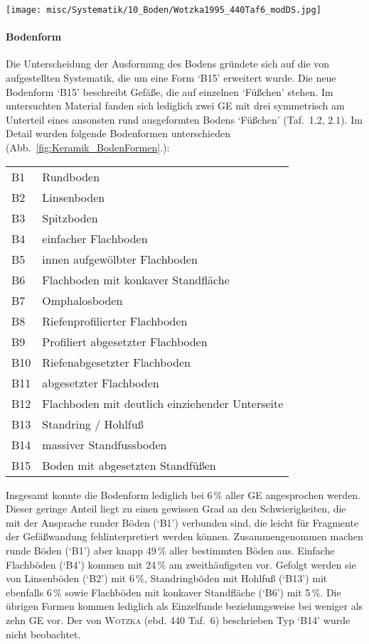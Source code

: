 \begin{figure*}[!tb]
	\centering
	\texttt{[image: misc/Systematik/10\_Boden/Wotzka1995\_440Taf6\_modDS.jpg]}
	\caption{Keramik: Bodenformen \parencite[nach][440 Taf.~6]{Wotzka.1995}.}
	\label{fig:Keramik_BodenFormen}
\end{figure*}

\paragraph{Bodenform}\label{sec:Bodenform}
$\;$ \\
Die Unterscheidung der Ausformung des Bodens gründete sich auf die von \textcite[440 Taf.~6]{Wotzka.1995} aufgestellten Systematik, die um eine Form \enquote*{B15} erweitert wurde. Die neue Bodenform \enquote*{B15} beschreibt Gefäße, die auf einzelnen \enquote*{Füßchen} stehen. Im untersuchten Material fanden sich lediglich zwei GE mit drei symmetrisch am Unterteil eines ansonsten rund ausgeformten Bodens \enquote*{Füßchen} (Taf.~1.2, 2.1). Im Detail wurden folgende Bodenformen unterschieden (Abb.~\ref{fig:Keramik_BodenFormen}.):
\setlength\LTleft{0pt}
\begin{longtable}{@{}ll@{}}
	B1 & Rundboden \\
	B2 & Linsenboden \\
	B3 & Spitzboden \\
	B4 & einfacher Flachboden \\
	B5 & innen aufgewölbter Flachboden  \\
	B6 & Flachboden mit konkaver Standfläche \\
	B7 & Omphalosboden \\
	B8 & Riefenprofilierter Flachboden \\
	B9 & Profiliert abgesetzter Flachboden \\
	B10 & Riefenabgesetzter Flachboden \\
	B11 & abgesetzter Flachboden \\
	B12 & Flachboden mit deutlich einziehender Unterseite \\
	B13 & Standring / Hohlfuß \\
	B14 & massiver Standfussboden \\
	B15 & Boden mit abgesetzten Standfüßen \\
\end{longtable}
\addtocounter{table}{-1}

\noindent Insgesamt konnte die Bodenform lediglich bei 6\,\% aller GE angesprochen werden. Dieser geringe Anteil liegt zu einen gewissen Grad an den Schwierigkeiten, die mit der Ansprache runder Böden (\enquote*{B1}) verbunden sind, die leicht für Fragmente der Gefäßwandung fehlinterpretiert werden können. Zusammengenommen machen runde Böden (\enquote*{B1}) aber knapp 49\,\% aller bestimmten Böden aus. Einfache Flachböden (\enquote*{B4}) kommen mit 24\,\% am zweithäufigsten vor. Gefolgt werden sie von Linsenböden (\enquote*{B2}) mit 6\,\%, Standringböden mit Hohlfuß (\enquote*{B13}) mit ebenfalls 6\,\% sowie Flachböden mit konkaver Standfläche (\enquote*{B6}) mit 5\,\%. Die übrigen Formen kommen lediglich als Einzelfunde beziehungsweise bei weniger als zehn GE vor. Der von \textsc{Wotzka} (ebd. 440 Taf.~6) beschrieben Typ \enquote*{B14} wurde nicht beobachtet.



